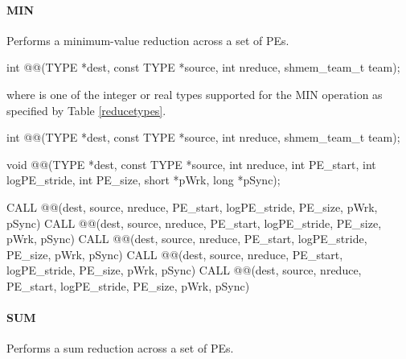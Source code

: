 \begin{apidefinition}
\paragraph{MIN}
Performs a minimum-value reduction across a set of \acp{PE}.\newline

{\color{Green}
\begin{C11synopsis}
int @@(TYPE *dest, const TYPE *source, int nreduce, shmem_team_t team);
\end{C11synopsis}
where \TYPE{} is one of the integer or real types supported for the MIN operation as specified by Table \ref{reducetypes}.
}

\begin{Csynopsis}
\end{Csynopsis}
{\color{Green}
\begin{CsynopsisCol}
int @@(TYPE *dest, const TYPE *source, int nreduce, shmem_team_t team);
\end{CsynopsisCol}
}
\begin{DeprecateBlock}
\begin{CsynopsisCol}
void @@(TYPE *dest, const TYPE *source, int nreduce, int PE_start, int logPE_stride, int PE_size, short *pWrk, long *pSync);
\end{CsynopsisCol}
\end{DeprecateBlock}

\begin{Fsynopsis}
CALL @@(dest, source, nreduce, PE_start, logPE_stride, PE_size, pWrk, pSync)
CALL @@(dest, source, nreduce, PE_start, logPE_stride, PE_size, pWrk, pSync)
CALL @@(dest, source, nreduce, PE_start, logPE_stride, PE_size, pWrk, pSync)
CALL @@(dest, source, nreduce, PE_start, logPE_stride, PE_size, pWrk, pSync)
CALL @@(dest, source, nreduce, PE_start, logPE_stride, PE_size, pWrk, pSync)
\end{Fsynopsis}

\paragraph{SUM}
Performs a sum reduction across a set of \acp{PE}.\newline


\end{apidefinition}
